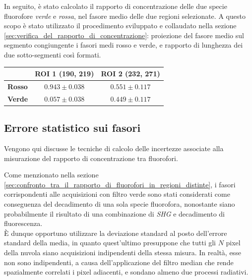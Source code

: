 In seguito, è stato calcolato il rapporto di concentrazione delle due specie fluorofore \textit{verde} e \textit{rossa}, nel fasore medio delle due regioni selezionate. A questo scopo è stato utilizzato il procedimento sviluppato e collaudato nella sezione \ref{sec:verifica_del_rapporto_di_concentrazione}: proiezione del fasore medio sul segmento congiungente i fasori medi rosso e verde, e rapporto di lunghezza dei due sotto-segmenti così formati.

\begin{table}[h!]

    \centering
    \label{tab:rapporti_concentrazione_ROI}
    \setlength{\tabcolsep}{8pt}

    \begin{tabular}{lcc}

        \hline
         & ROI 1 (190, 219) & ROI 2 (232, 271) \\
        \hline
        \textbf{Rosso} & $0.943 \pm 0.038$  & $0.551 \pm 0.117$ \\
        \textbf{Verde} & $0.057 \pm 0.038$ & $0.449 \pm 0.117$ \\
        \hline

    \end{tabular}

\end{table}


\subsection{Errore statistico sui fasori}
\label{sec:errore_statistico_sui_fasori}

Vengono qui discusse le tecniche di calcolo delle incertezze associate alla misurazione del rapporto di concentrazione tra fluorofori.


Come menzionato nella sezione \ref{sec:confronto_tra_il_rapporto_di_fluorofori_in_regioni_distinte}, i fasori corrispondenti alle acquisizioni con filtro verde sono stati considerati come conseguenza del decadimento di una sola specie fluorofora, nonostante siano probabilmente il risultato di una combinazione di \textit{SHG} e decadimento di fluorescenza.\\
È dunque opportuno  utilizzare la deviazione standard al posto dell'errore standard della media, in quanto quest'ultimo presuppone che tutti gli $N$ pixel della nuvola siano acquisizioni indipendenti della stessa misura. In realtà, esse non sono indipendenti, a causa dell'applicazione del filtro median che rende spazialmente correlati i pixel adiacenti, e sondano almeno due processi radiativi.

